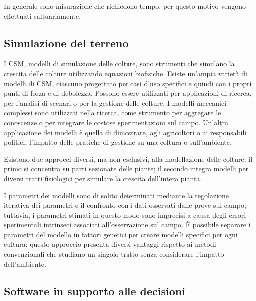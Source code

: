 \documentclass[12pt,a4paper,openright,twoside]{book}
\begin{document}
In generale sono misurazione che richiedono tempo, per questo motivo vengono effettuati saltuariamente.

\subsection{Simulazione del terreno}

I \ac{CSM}, modelli di simulazione delle colture, sono strumenti che simulano la crescita delle colture utilizzando equazioni biofisiche\cite{KELLY2023107986}.
Esiste un'ampia varietà di modelli di \ac{CSM}, ciascuno progettato per casi d'uso specifici e quindi con i propri punti di forza e di debolezza.
Possono essere utilizzati per applicazioni di ricerca, per l'analisi di scenari o per la gestione delle colture. I modelli meccanici complessi sono utilizzati nella ricerca, come strumento per aggregare le conoscenze o per integrare le costose sperimentazioni sul campo. Un'altra applicazione dei modelli è quella di dimostrare, agli agricoltori o ai responsabili politici, l'impatto delle pratiche di gestione su una coltura o sull'ambiente\cite{MATTHEWS201324}.

Esistono due approcci diversi, ma non esclusivi, alla modellazione delle colture: il primo si concentra su parti sezionate delle piante; il secondo integra modelli per diversi tratti fisiologici per simulare la crescita dell'intera pianta.

I parametri dei modelli sono di solito determinati mediante la regolazione iterativa dei parametri e il confronto con i dati osservati dalle prove sul campo; tuttavia, i parametri stimati in questo modo sono imprecisi a causa degli errori sperimentali intrinseci associati all'osservazione sul campo. È possibile separare i parametri del modello in fattori genetici per creare modelli specifici per ogni cultura: questo approccio presenta diversi vantaggi rispetto ai metodi convenzionali che studiano un singolo tratto senza considerare l'impatto dell'ambiente\cite{LI2012219}.

\subsection{Software in supporto alle decisioni}
\end{document}
